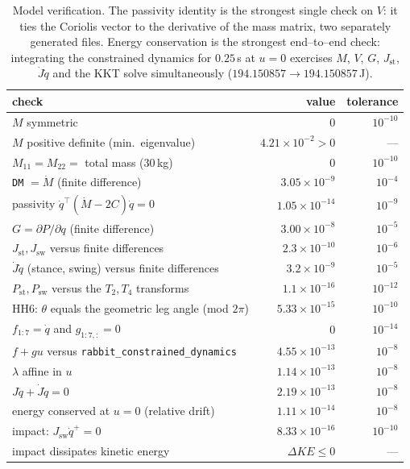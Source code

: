 \documentclass[11pt,a4paper]{article}
\newcommand{\code}[1]{\texttt{#1}}          %
\begin{document}
\begin{table}[h]
\centering
\begin{tabular}{@{}L{7.4cm} r r@{}}
\toprule
check & value & tolerance \\
\midrule
$M$ symmetric                                   & $0$                    & $10^{-10}$ \\
$M$ positive definite (min.\ eigenvalue)        & $4.21\times10^{-2}>0$  & --- \\
$M_{11}=M_{22}=$ total mass ($30\,$kg)          & $0$                    & $10^{-10}$ \\
\code{DM} $=\dot M$ (finite difference)         & $3.05\times10^{-9}$    & $10^{-4}$ \\
passivity $\dot q^{\top}(\dot M - 2C)\dot q = 0$ & $1.05\times10^{-14}$  & $10^{-9}$ \\
$G = \partial P/\partial q$ (finite difference) & $3.00\times10^{-8}$    & $10^{-5}$ \\
$J_{\mathrm{st}},J_{\mathrm{sw}}$ versus finite differences & $2.3\times10^{-10}$ & $10^{-6}$ \\
$\dot J\dot q$ (stance, swing) versus finite differences & $3.2\times10^{-9}$ & $10^{-5}$ \\
$P_{\mathrm{st}},P_{\mathrm{sw}}$ versus the $T_2,T_4$ transforms & $1.1\times10^{-16}$ & $10^{-12}$ \\
HH6: $\theta$ equals the geometric leg angle (mod $2\pi$) & $5.33\times10^{-15}$ & $10^{-10}$ \\
$f_{1:7}=\dot q$ and $g_{1:7,:}=0$              & $0$                    & $10^{-14}$ \\
$f+gu$ versus \code{rabbit\_constrained\_dynamics} & $4.55\times10^{-13}$ & $10^{-8}$ \\
$\lambda$ affine in $u$                         & $1.14\times10^{-13}$   & $10^{-8}$ \\
$J\ddot q + \dot J\dot q = 0$                   & $2.19\times10^{-13}$   & $10^{-8}$ \\
energy conserved at $u=0$ (relative drift)      & $1.11\times10^{-14}$   & $10^{-8}$ \\
impact: $J_{\mathrm{sw}}\dot q^{+}=0$           & $8.33\times10^{-16}$   & $10^{-10}$ \\
impact dissipates kinetic energy                & $\Delta KE \le 0$      & --- \\
\bottomrule
\end{tabular}
\caption{Model verification. The passivity identity is the strongest single
check on $V$: it ties the Coriolis vector to the derivative of the mass matrix,
two separately generated files. Energy conservation is the strongest end--to--end
check: integrating the constrained dynamics for $0.25\,$s at $u=0$ exercises
$M$, $V$, $G$, $J_{\mathrm{st}}$, $\dot J\dot q$ and the KKT solve simultaneously
($194.150857 \to 194.150857\,$J).}
\end{table}
\end{document}
